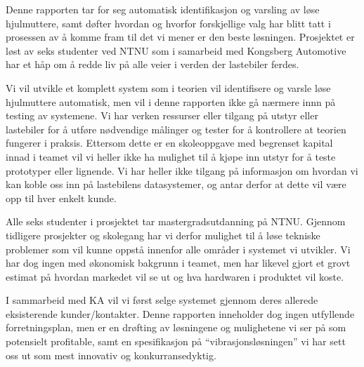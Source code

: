 
Denne rapporten tar for seg automatisk identifikasjon og varsling av løse hjulmuttere, samt døfter hvordan og hvorfor forskjellige
valg har blitt tatt i prosessen av å komme fram til det vi mener er den beste løsningen. Prosjektet er løst av seks studenter ved NTNU
som i samarbeid med Kongsberg Automotive har et håp om å redde liv på alle veier i verden der lastebiler ferdes. 

Vi vil utvikle et komplett system som i teorien vil identifisere og varsle løse hjulmuttere automatisk, men vil i denne rapporten ikke 
gå nærmere innn på testing av systemene. Vi har verken ressurser eller tilgang på utstyr eller lastebiler for å utføre 
nødvendige målinger og tester for å kontrollere at teorien fungerer i praksis. Ettersom dette er en skoleoppgave med begrenset
kapital innad i teamet vil vi heller ikke ha mulighet til å kjøpe inn utstyr for å teste prototyper eller lignende. Vi har heller ikke 
tilgang på informasjon om hvordan vi kan koble oss inn på lastebilens datasystemer, og antar derfor at dette vil være opp til hver
enkelt kunde.

Alle seks studenter i prosjektet tar mastergradsutdanning på NTNU. Gjennom tidligere prosjekter og skolegang har vi derfor
mulighet til å løse tekniske problemer som vil kunne oppstå innenfor alle områder i systemet vi utvikler. Vi har dog ingen med
økonomisk bakgrunn i teamet, men har likevel gjort et grovt estimat på hvordan markedet vil se ut og hva hardwaren i produktet
vil koste.

I sammarbeid med KA vil vi først selge systemet gjennom deres allerede eksisterende kunder/kontakter. Denne rapporten
inneholder dog ingen utfyllende forretningsplan, men er en drøfting av løsningene og mulighetene vi ser på
som potensielt profitable, samt en spesifikasjon på ``vibrasjonsløsningen'' vi har sett oss ut som mest innovativ og konkurransedyktig.
